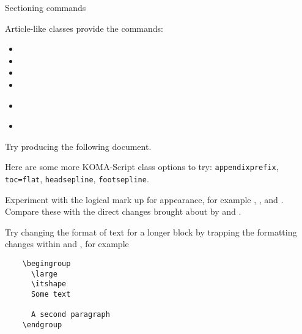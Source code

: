 \begin{frame}{Sectioning commands}

  Article-like classes provide the commands:
  \begin{itemize}
    \item {}
    \item {}
    \item {}
    \item {}
    \item 
      \alert<3>{}
    \item {}
  \end{itemize}
  
  \vspace{2 em}

\end{frame}

\begin{exercise}
  Try producing the following document.
  

  Here are some more KOMA-Script class options to try: 
  \texttt{appendixprefix}, \texttt{toc=flat}, \texttt{headsepline},
  \texttt{footsepline}.
  
  Experiment with the logical mark up for appearance, for example
  , ,  and . Compare these
  with the direct changes brought about by  and .
  
  Try changing the format of text for a longer block by trapping the
  formatting changes within  and , for
  example
  \begin{verbatim}
    \begingroup
      \large
      \itshape
      Some text
      
      A second paragraph
    \endgroup
  \end{verbatim}
  
\end{exercise}

